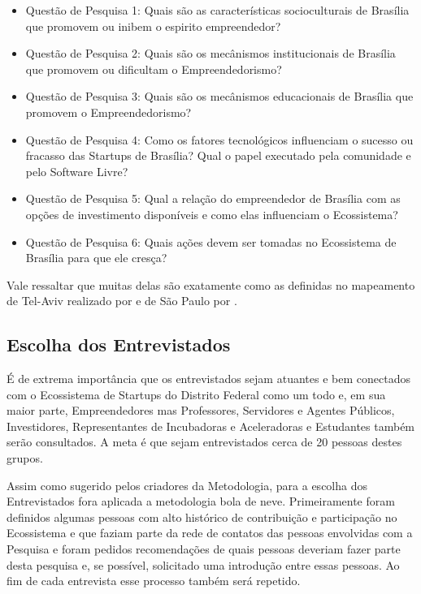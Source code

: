 \begin{itemize}
  \item Questão de Pesquisa 1: Quais são as características socioculturais de Brasília que promovem ou inibem o espirito empreendedor?
  \item Questão de Pesquisa 2: Quais são os mecânismos institucionais de Brasília que promovem ou dificultam o Empreendedorismo?
  \item Questão de Pesquisa 3: Quais são os mecânismos educacionais de Brasília que promovem o Empreendedorismo?
  \item Questão de Pesquisa 4: Como os fatores tecnológicos influenciam o sucesso ou fracasso das Startups de Brasília? Qual o papel executado pela comunidade e pelo Software Livre?
  \item Questão de Pesquisa 5: Qual a relação do empreendedor de Brasília com as opções de investimento disponíveis e como elas influenciam o Ecossistema?
  \item Questão de Pesquisa 6: Quais ações devem ser tomadas no Ecossistema de Brasília para que ele cresça?
\end{itemize}

Vale ressaltar que muitas delas são exatamente como as definidas no mapeamento de Tel-Aviv realizado por  e de São Paulo por .

\subsection{Escolha dos Entrevistados}
\label{subsection:escolha_dos_entrevistados}

É de extrema importância que os entrevistados sejam atuantes e bem conectados com o Ecossistema de Startups do Distrito Federal como um todo e, em sua maior parte, Empreendedores mas Professores, Servidores e Agentes Públicos, Investidores, Representantes de Incubadoras e Aceleradoras e Estudantes também serão consultados. A meta é que sejam entrevistados cerca de 20 pessoas destes grupos.

Assim como sugerido pelos criadores da Metodologia, para a escolha dos Entrevistados fora aplicada a metodologia bola de neve. Primeiramente foram definidos algumas pessoas com alto histórico de contribuição e participação no Ecossistema e que faziam parte da rede de contatos das pessoas envolvidas com a Pesquisa e foram pedidos recomendações de quais pessoas deveriam fazer parte desta pesquisa e, se possível, solicitado uma introdução entre essas pessoas. Ao fim de cada entrevista esse processo também será repetido. 

